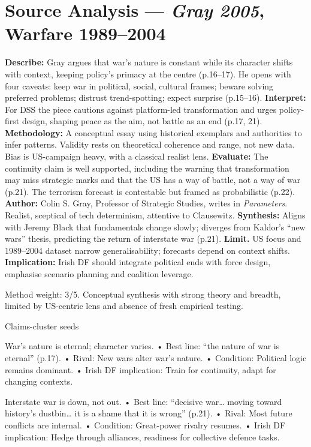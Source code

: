 \section*{Source Analysis — \textit{Gray 2005}, Warfare 1989–2004}
\textbf{Describe:} Gray argues that war’s nature is constant while its character shifts with context, keeping policy’s primacy at the centre (p.16–17). He opens with four caveats: keep war in political, social, cultural frames; beware solving preferred problems; distrust trend-spotting; expect surprise (p.15–16).
\textbf{Interpret:} For DSS the piece cautions against platform-led transformation and urges policy-first design, shaping peace as the aim, not battle as an end (p.17, 21).
\textbf{Methodology:} A conceptual essay using historical exemplars and authorities to infer patterns. Validity rests on theoretical coherence and range, not new data. Bias is US-campaign heavy, with a classical realist lens.
\textbf{Evaluate:} The continuity claim is well supported, including the warning that transformation may miss strategic marks and that the US has a way of battle, not a way of war (p.21). The terrorism forecast is contestable but framed as probabilistic (p.22).
\textbf{Author:} Colin S. Gray, Professor of Strategic Studies, writes in \textit{Parameters}. Realist, sceptical of tech determinism, attentive to Clausewitz.
\textbf{Synthesis:} Aligns with Jeremy Black that fundamentals change slowly; diverges from Kaldor’s “new wars” thesis, predicting the return of interstate war (p.21).
\textbf{Limit.} US focus and 1989–2004 dataset narrow generalisability; forecasts depend on context shifts. \textbf{Implication:} Irish DF should integrate political ends with force design, emphasise scenario planning and coalition leverage.

Method weight: 3/5. Conceptual synthesis with strong theory and breadth, limited by US-centric lens and absence of fresh empirical testing.

Claims-cluster seeds

War’s nature is eternal; character varies.
• Best line: “the nature of war is eternal” (p.17).
• Rival: New wars alter war’s nature.
• Condition: Political logic remains dominant.
• Irish DF implication: Train for continuity, adapt for changing contexts.

Interstate war is down, not out.
• Best line: “decisive war… moving toward history’s dustbin… it is a shame that it is wrong” (p.21).
• Rival: Most future conflicts are internal.
• Condition: Great-power rivalry resumes.
• Irish DF implication: Hedge through alliances, readiness for collective defence tasks.

